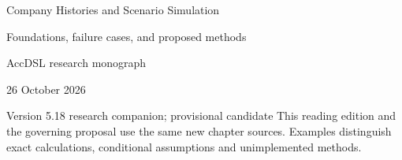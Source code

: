 \documentclass[11pt,a4paper]{report}
\begin{document}
\hypersetup{pageanchor=false}
\begin{titlepage}
{\Huge Company Histories and Scenario Simulation\par}
\vspace{12mm}
{\Large Foundations, failure cases, and proposed methods\par}
\vspace{8mm}
AccDSL research monograph\par 26 October 2026\par Version 5.18 research companion; provisional candidate
\vfill
This reading edition and the governing proposal use the same new chapter sources. Examples distinguish exact calculations, conditional assumptions and unimplemented methods.
\end{titlepage}
\hypersetup{pageanchor=true}
\tableofcontents
\clearpage{}


























\clearpage\label{sim:body-end}

\begingroup\raggedright
\endgroup
\end{document}
